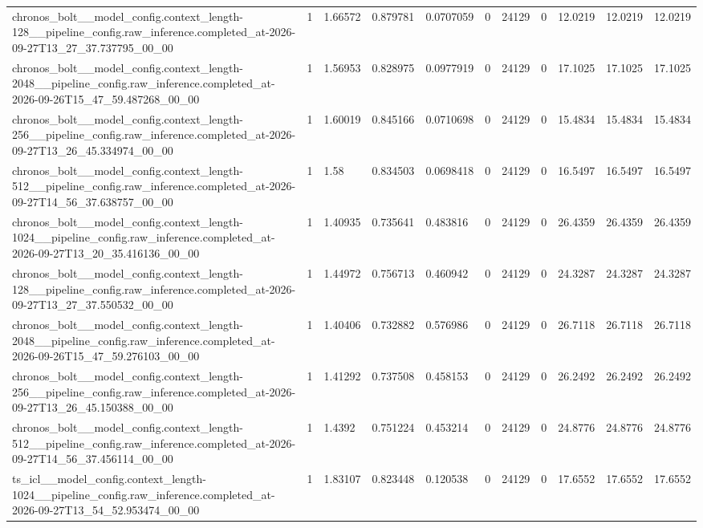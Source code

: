 \begin{tabular}{lllllllllll}
chronos\_bolt\_\_model\_config.context\_length-128\_\_pipeline\_config.raw\_inference.completed\_at-2026-09-27T13\_27\_37.737795\_00\_00 & 1 & 1.66572 & 0.879781 & 0.0707059 & 0 & 24129 & 0 & 12.0219 & 12.0219 & 12.0219 \\
chronos\_bolt\_\_model\_config.context\_length-2048\_\_pipeline\_config.raw\_inference.completed\_at-2026-09-26T15\_47\_59.487268\_00\_00 & 1 & 1.56953 & 0.828975 & 0.0977919 & 0 & 24129 & 0 & 17.1025 & 17.1025 & 17.1025 \\
chronos\_bolt\_\_model\_config.context\_length-256\_\_pipeline\_config.raw\_inference.completed\_at-2026-09-27T13\_26\_45.334974\_00\_00 & 1 & 1.60019 & 0.845166 & 0.0710698 & 0 & 24129 & 0 & 15.4834 & 15.4834 & 15.4834 \\
chronos\_bolt\_\_model\_config.context\_length-512\_\_pipeline\_config.raw\_inference.completed\_at-2026-09-27T14\_56\_37.638757\_00\_00 & 1 & 1.58 & 0.834503 & 0.0698418 & 0 & 24129 & 0 & 16.5497 & 16.5497 & 16.5497 \\
chronos\_bolt\_\_model\_config.context\_length-1024\_\_pipeline\_config.raw\_inference.completed\_at-2026-09-27T13\_20\_35.416136\_00\_00 & 1 & 1.40935 & 0.735641 & 0.483816 & 0 & 24129 & 0 & 26.4359 & 26.4359 & 26.4359 \\
chronos\_bolt\_\_model\_config.context\_length-128\_\_pipeline\_config.raw\_inference.completed\_at-2026-09-27T13\_27\_37.550532\_00\_00 & 1 & 1.44972 & 0.756713 & 0.460942 & 0 & 24129 & 0 & 24.3287 & 24.3287 & 24.3287 \\
chronos\_bolt\_\_model\_config.context\_length-2048\_\_pipeline\_config.raw\_inference.completed\_at-2026-09-26T15\_47\_59.276103\_00\_00 & 1 & 1.40406 & 0.732882 & 0.576986 & 0 & 24129 & 0 & 26.7118 & 26.7118 & 26.7118 \\
chronos\_bolt\_\_model\_config.context\_length-256\_\_pipeline\_config.raw\_inference.completed\_at-2026-09-27T13\_26\_45.150388\_00\_00 & 1 & 1.41292 & 0.737508 & 0.458153 & 0 & 24129 & 0 & 26.2492 & 26.2492 & 26.2492 \\
chronos\_bolt\_\_model\_config.context\_length-512\_\_pipeline\_config.raw\_inference.completed\_at-2026-09-27T14\_56\_37.456114\_00\_00 & 1 & 1.4392 & 0.751224 & 0.453214 & 0 & 24129 & 0 & 24.8776 & 24.8776 & 24.8776 \\
ts\_icl\_\_model\_config.context\_length-1024\_\_pipeline\_config.raw\_inference.completed\_at-2026-09-27T13\_54\_52.953474\_00\_00 & 1 & 1.83107 & 0.823448 & 0.120538 & 0 & 24129 & 0 & 17.6552 & 17.6552 & 17.6552 \\

\end{tabular}

